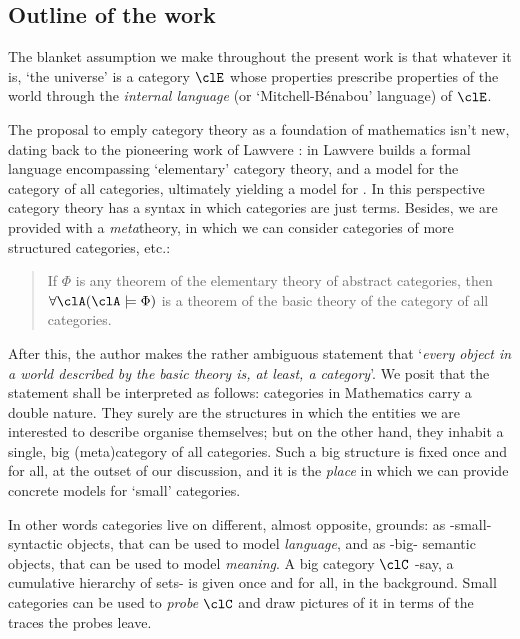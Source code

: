 
\subsection{Outline of the work}

The blanket assumption we make throughout the present work is that whatever it is, `the universe' is a category $\clE$ whose properties prescribe properties of the world through the \emph{internal language} (or `Mitchell-Bénabou' language) of $\clE$. 

The proposal to emply category theory as a foundation of mathematics isn't new, dating back to the pioneering work of Lawvere \cite{lawvere1964elementary,lajolla,lawvere1969adjointness,lawvere1963functorial}: in \cite{lajolla} Lawvere builds a formal language  encompassing `elementary' category theory, and a model  for the category of all categories, ultimately yielding a model for . In this perspective category theory has a syntax in which categories are just terms. Besides, we are provided with a \emph{meta}theory, in which we can consider categories of more structured categories, etc.:
\begin{quote}
	If $\Phi$ is any theorem of the elementary theory of abstract categories, then $\forall \clA (\clA \models \Phi)$ is a theorem of the basic theory of the category of all categories. \hfill \cite{lajolla}
\end{quote}
After this, the author makes the rather ambiguous statement that `\textit{every object in a world described by the basic theory is, at least, a category}'. We posit that the statement shall be interpreted as follows: categories in Mathematics carry a double nature. They surely are the structures in which the entities we are interested to describe organise themselves; but on the other hand, they inhabit a single, big (meta)category of all categories. Such a big structure is fixed once and for all, at the outset of our discussion, and it is the \emph{place} in which we can provide concrete models for `small' categories.

In other words categories live on different, almost opposite, grounds: as -small- syntactic objects, that can be used to model \emph{language}, and as -big- semantic objects, that can be used to model \emph{meaning}. A big category $\clC$ -say, a cumulative hierarchy of sets- is given once and for all, in the background. Small categories can be used to \emph{probe} $\clC$ and draw pictures of it in terms of the traces the probes leave.

